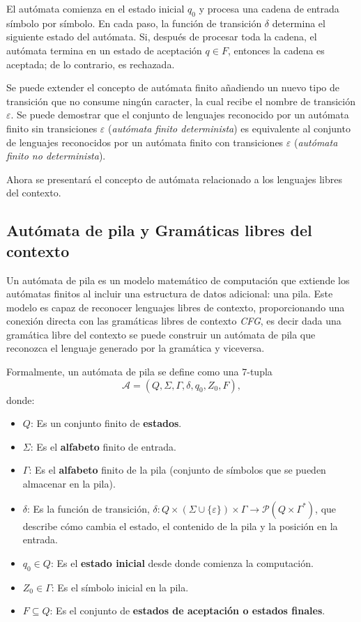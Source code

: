 \documentclass[12pt]{article}
\begin{document}
El autómata comienza en el estado inicial $q_0$ y procesa una cadena de entrada símbolo por símbolo. En cada paso, la función de transición $\delta$ determina el siguiente estado del autómata. Si, después de procesar toda la cadena, el autómata termina en un estado de aceptación $q \in F$, entonces la cadena es aceptada; de lo contrario, es rechazada.

Se puede extender el concepto de autómata finito añadiendo un nuevo tipo de transición que no consume ningún caracter, la cual recibe el nombre de transición $\varepsilon$.
Se puede demostrar que el conjunto de lenguajes reconocido por un autómata finito sin transiciones $\varepsilon$ (\textit{autómata finito determinista}) es equivalente al conjunto de lenguajes reconocidos por un autómata finito con transiciones $\varepsilon$ (\textit{autómata finito no determinista}).

Ahora se presentará el concepto de autómata relacionado a los lenguajes libres del contexto.
\subsection{Autómata de pila y Gramáticas libres del contexto}

Un autómata de pila \cite{authomataTheory} es un modelo matemático de computación que extiende los autómatas finitos al incluir una estructura de datos adicional: una pila. Este modelo es capaz de reconocer lenguajes libres de contexto,
proporcionando una conexión directa con las gramáticas libres de contexto \textit{CFG}, es decir dada una gramática libre del contexto se puede construir un autómata de pila que reconozca el lenguaje generado por la gramática y viceversa.

Formalmente, un autómata de pila se define como una 7-tupla
\[
      \mathcal{A} = (Q, \Sigma, \Gamma, \delta, q_0, Z_0, F),
\]
donde:

\begin{itemize}
      \item $Q$: Es un conjunto finito de \textbf{estados}.
      \item $\Sigma$: Es el \textbf{alfabeto} finito de entrada.
      \item $\Gamma$: Es el \textbf{alfabeto} finito de la pila (conjunto de símbolos que se pueden almacenar en la pila).
      \item $\delta$: Es la función de transición, $\delta: Q \times (\Sigma \cup \{\varepsilon\}) \times \Gamma \to \mathcal{P}(Q \times \Gamma^*)$, que describe cómo cambia el estado, el contenido de la pila y la posición en la entrada.
      \item $q_0 \in Q$: Es el \textbf{estado inicial} desde donde comienza la computación.
      \item $Z_0 \in \Gamma$: Es el símbolo inicial en la pila.
      \item $F \subseteq Q$: Es el conjunto de \textbf{estados de aceptación o estados finales}.
\end{itemize}
\end{document}

